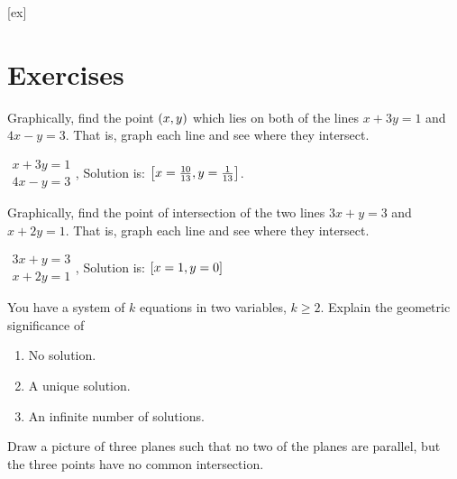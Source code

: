 [ex]
\section*{Exercises}

\begin{enumialphparenastyle}

\begin{ex}
Graphically, find the point $\left(x,y\right)$ which
lies on both of the lines $x+3y=1$ and $4x-y=3$. That is, graph each line
and see where they intersect.

\begin{sol}
$\begin{array}{c}
x+3y=1 \\
4x-y=3
\end{array}$, Solution is: $\left[x=\frac{10}{13},y=\frac{1}{13}\right] $.
\end{sol}
\end{ex}


\begin{ex}
Graphically, find the point of intersection of the two lines $
3x+y=3$ and $x+2y=1$. That is, graph each line
and see where they intersect. 

\begin{sol}
$\begin{array}{c}
3x+y=3 \\
x+2y=1
\end{array}
$, Solution is: $\left[x=1,y=0\right] $
\end{sol}
\end{ex}

\begin{ex} You have a system of $k$ equations in two variables, $k\geq 2$.
Explain the geometric significance of

\begin{enumerate}
\item No solution.

\item A unique solution.

\item An infinite number of solutions.
\end{enumerate}

\end{ex}

\begin{ex}
  Draw a picture of three planes such that no two of the planes are
  parallel, but the three points have no common intersection.


\end{ex}
\end{enumialphparenastyle}
